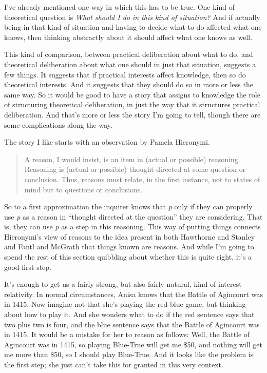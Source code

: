 \documentclass[
  11pt,
]{book}
\begin{document}
I've already mentioned one way in which this has to be true. One kind of theoretical question is \emph{What should I do in this kind of situation?} And if actually being in that kind of situation and having to decide what to do affected what one knows, then thinking abstractly about it should affect what one knows as well.

This kind of comparison, between practical deliberation about what to do, and theoretical deliberation about what one should in just that situation, suggests a few things. It suggests that if practical interests affect knowledge, then so do theoretical interests. And it suggests that they should do so in more or less the same way. So it would be good to have a story that assigns to knowledge the role of structuring theoretical deliberation, in just the way that it structures practical deliberation. And that's more or less the story I'm going to tell, though there are some complications along the way.

The story I like starts with an observation by Pamela Hieronymi.

\begin{quote}
A reason, I would insist, is an item in (actual or possible) reasoning. Reasoning is (actual or possible) thought directed at some question or conclusion. Thus, reasons must relate, in the first instance, not to states of mind but to questions or conclusions. \citep[115-6]{Hieronymi2013}
\end{quote}

So to a first approximation the inquirer knows that \emph{p} only if they can properly use \emph{p} as a reason in ``thought directed at the question'' they are considering. That is, they can use \emph{p} as a step in this reasoning. This way of putting things connects Hieronymi's view of reasons to the idea present in both Hawthorne and Stanley \citeyearpar{HawthorneStanley2008} and Fantl and McGrath \citeyearpar{FantlMcGrath2009} that things known are reasons. And while I'm going to spend the rest of this section quibbling about whether this is quite right, it's a good first step.

It's enough to get us a fairly strong, but also fairly natural, kind of interest-relativity. In normal circumstances, Anisa knows that the Battle of Agincourt was in 1415. Now imagine not that she's playing the red-blue game, but thinking about how to play it. And she wonders what to do if the red sentence says that two plus two is four, and the blue sentence says that the Battle of Agincourt was in 1415. It would be a mistake for her to reason as follows: Well, the Battle of Agincourt was in 1415, so playing Blue-True will get me \$50, and nothing will get me more than \$50, so I should play Blue-True. And it looks like the problem is the first step; she just can't take this for granted in this very context.
\end{document}
